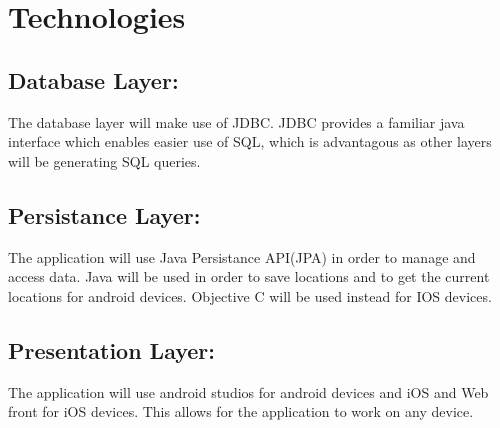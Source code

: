 \documentclass[11pt]{article}
\begin{document}
\section{Technologies}
\subsection{Database Layer:}
	The database layer will make use of JDBC. JDBC provides a familiar java interface which enables easier use of SQL, which is advantagous as other layers will be generating SQL queries.
\subsection{Persistance Layer:}
	The application will use Java Persistance API(JPA) in order to manage and access data.
	Java will be used in order to save locations and to get the current locations for android devices.
	Objective C will be used instead for IOS devices.
\subsection{Presentation Layer:}
		The application will use android studios for android devices and iOS and Web front for iOS devices. This allows for the application to work on any device.
\end{document}
